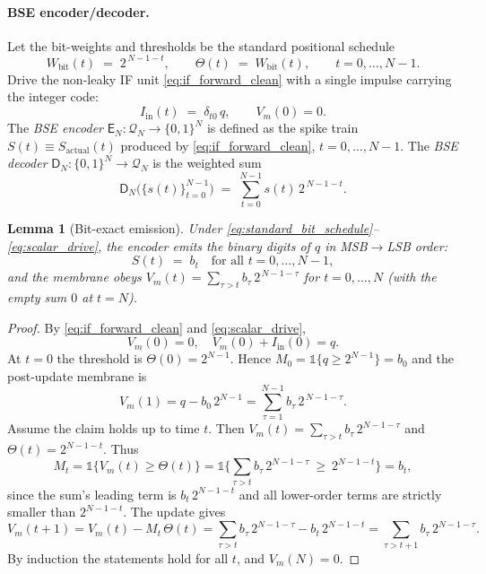 \documentclass{article}
\theoremstyle{plain}
\newtheorem{lemma}[theorem]{Lemma}
\theoremstyle{definition}
\theoremstyle{remark}
\begin{document}
\paragraph{BSE encoder/decoder.}
Let the bit-weights and thresholds be the standard positional schedule
\begin{equation}
\label{eq:standard_bit_schedule}
W_{\mathrm{bit}}(t) \;=\; 2^{\,N-1-t},
\qquad 
\Theta(t) \;=\; W_{\mathrm{bit}}(t),
\qquad t=0,\dots,N-1.
\end{equation}
Drive the non-leaky IF unit \eqref{eq:if_forward_clean} with a single impulse carrying the integer code:
\begin{equation}
\label{eq:scalar_drive}
I_{\mathrm{in}}(t) \;=\; \delta_{t0}\,q,
\qquad 
V_m(0)=0.
\end{equation}
The \emph{BSE encoder} $\mathsf{E}_N:\mathcal{Q}_N\to\{0,1\}^{N}$ is defined as the spike train $S(t)\equiv S_{\mathrm{actual}}(t)$ produced by \eqref{eq:if_forward_clean}, $t=0,\dots,N-1$. The \emph{BSE decoder} $\mathsf{D}_N:\{0,1\}^{N}\to\mathcal{Q}_N$ is the weighted sum
\begin{equation}
\label{eq:bse_decoder}
\mathsf{D}_N\big(\{s(t)\}_{t=0}^{N-1}\big) \;=\; \sum_{t=0}^{N-1} s(t)\,2^{\,N-1-t}.
\end{equation}

\begin{lemma}[Bit-exact emission]
\label{lem:bit_exact}
Under \eqref{eq:standard_bit_schedule}–\eqref{eq:scalar_drive}, the encoder emits the binary digits of $q$ in MSB$\to$LSB order:
\[
S(t)\;=\;b_t\quad\text{for all }t=0,\dots,N-1,
\]
and the membrane obeys $V_m(t)=\sum_{\tau>t} b_\tau\,2^{\,N-1-\tau}$ for $t=0,\dots,N$ (with the empty sum $0$ at $t=N$).
\end{lemma}

\begin{proof}
By \eqref{eq:if_forward_clean} and \eqref{eq:scalar_drive},
\[
V_m(0)=0,\quad V_m(0)+I_{\mathrm{in}}(0)=q.
\]
At $t=0$ the threshold is $\Theta(0)=2^{N-1}$. Hence $M_0=\mathbb{1}\{q\ge 2^{N-1}\}=b_0$ and the post-update membrane is
\[
V_m(1)=q-b_0\,2^{N-1}=\sum_{\tau=1}^{N-1} b_\tau\,2^{\,N-1-\tau}.
\]
Assume the claim holds up to time $t$. Then $V_m(t)=\sum_{\tau>t} b_\tau\,2^{N-1-\tau}$ and $\Theta(t)=2^{N-1-t}$. Thus
\[
M_t=\mathbb{1}\{V_m(t)\ge \Theta(t)\}=\mathbb{1}\Big\{\sum_{\tau>t} b_\tau\,2^{N-1-\tau}\ \ge\ 2^{N-1-t}\Big\}=b_t,
\]
since the sum's leading term is $b_t\,2^{N-1-t}$ and all lower-order terms are strictly smaller than $2^{N-1-t}$. The update gives
\[
V_m(t+1)=V_m(t)-M_t\,\Theta(t)=\sum_{\tau>t} b_\tau\,2^{N-1-\tau}-b_t\,2^{N-1-t}=\sum_{\tau>t+1} b_\tau\,2^{N-1-\tau}.
\]
By induction the statements hold for all $t$, and $V_m(N)=0$.
\end{proof}
\end{document}
